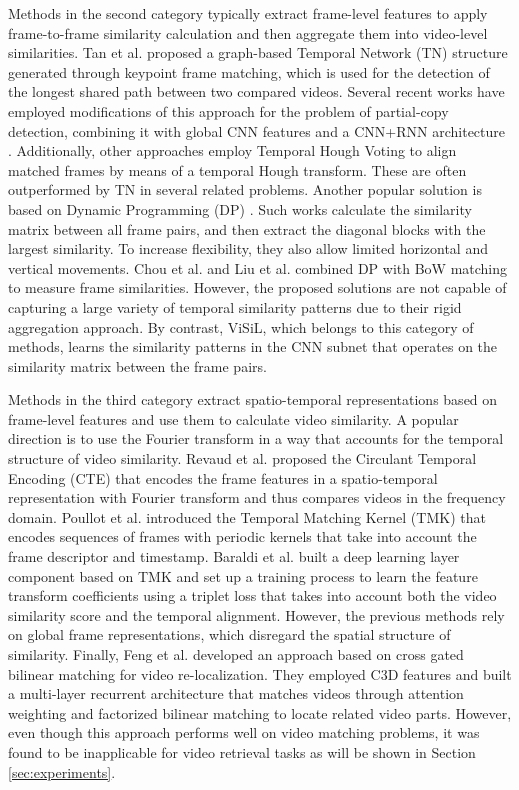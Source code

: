 \documentclass[10pt,twocolumn,letterpaper]{article}
\begin{document}
Methods in the second category typically extract frame-level features to apply frame-to-frame similarity calculation and then aggregate them into video-level similarities. Tan et al. \cite{tan2009} proposed a graph-based Temporal Network (TN) structure generated through keypoint frame matching, which is used for the detection of the longest shared path between two compared videos. Several recent works have employed modifications of this approach for the problem of partial-copy detection, combining it with global CNN features \cite{jiang2016} and a CNN+RNN architecture \cite{hu2018}. Additionally, other approaches employ
Temporal Hough Voting \cite{douze2010, jiang2014} to align matched frames by means of a temporal Hough transform. These are often outperformed by TN in several related problems. Another popular solution is based on Dynamic Programming (DP) \cite{chou2015, liu2017}. Such works calculate the similarity matrix between all frame pairs, and then extract the diagonal blocks with the largest similarity. To increase flexibility, they also allow limited horizontal and vertical movements. Chou et al. \cite{chou2015} and Liu et al. \cite{liu2017} combined DP with BoW matching to measure frame similarities. However, the proposed solutions are not capable of capturing a large variety of temporal similarity patterns
due to their rigid aggregation approach. By contrast, ViSiL, which belongs to this category of methods, learns the similarity patterns in the CNN subnet that operates on the similarity matrix between the frame pairs.



Methods in the third category extract spatio-temporal representations based on frame-level features and use them to calculate video similarity. A popular direction is to use  the Fourier transform in a way that accounts for the temporal structure of video similarity. Revaud et al. \cite{revaud2013} proposed the Circulant Temporal Encoding (CTE) that encodes the frame features in a spatio-temporal representation with Fourier transform and thus compares videos in the frequency domain. Poullot et al. \cite{poullot2015} introduced the Temporal Matching Kernel (TMK) that encodes sequences of frames with periodic kernels that take into account the frame descriptor and timestamp. Baraldi et al. \cite{baraldi2018} built a deep learning layer component based on TMK and set up a training process to learn the feature transform coefficients using a triplet loss that takes into account both the video similarity score and the temporal alignment. However, the previous methods rely on global frame representations, which disregard the spatial structure of similarity. Finally, Feng et al. \cite{feng2018} developed an approach based on cross gated bilinear matching for video re-localization. They employed C3D features \cite{tran2015} and built a multi-layer recurrent architecture that matches videos through attention weighting and factorized bilinear matching to locate related video parts. However, even though this approach performs well on video matching problems, it was found to be inapplicable for video retrieval tasks as will be shown in Section \ref{sec:experiments}. 
\end{document}
